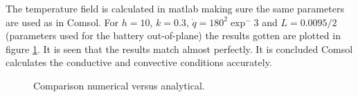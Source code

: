 The temperature field is calculated in matlab making sure the same parameters are used as in Comsol. For $h = 10$, $k = 0.3$, $\dot{q} = 180^2 \exp^-3$ and $L = 0.0095/2$ (parameters used for the battery out-of-plane) the results gotten are plotted in figure \ref{Fig:Comparison}. It is seen that the results match almost perfectly. It is concluded Comsol calculates the conductive and convective conditions accurately.

\begin{figure}[H]
  \centering
  \hfill
  \caption{Comparison numerical versus analytical.}
  \label{Fig:Comparison}
\end{figure}










\newpage